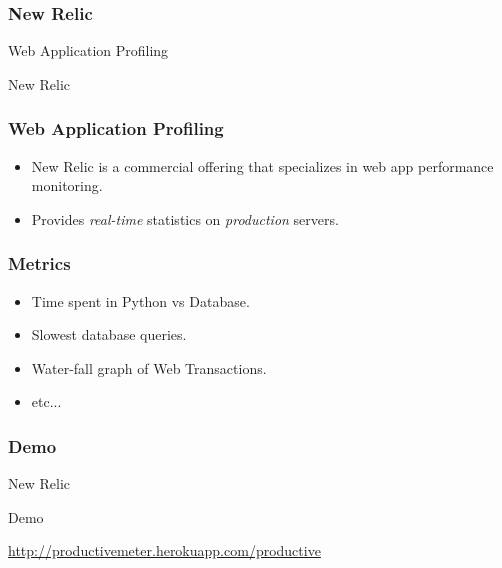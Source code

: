 \documentclass[c,english]{beamer}
\begin{document}
\begin{frame}[fragile]
\frametitle{New Relic}


\begin{block}{ \centering \LARGE Web Application Profiling }

\centering \Large New Relic

\end{block}
\end{frame}

\begin{frame}[fragile]
\frametitle{Web Application Profiling}

\begin{itemize}

\item New Relic is a commercial offering that specializes in web app performance monitoring.

\item Provides \emph{real-time} statistics on \emph{production} servers.
\end{itemize}
\end{frame}

\begin{frame}[fragile]
\frametitle{Metrics}

\begin{itemize}

\item Time spent in Python vs Database.

\item Slowest database queries.

\item Water-fall graph of Web Transactions.

\item etc...
\end{itemize}
\end{frame}

\begin{frame}[fragile]
\frametitle{Demo}


\begin{block}{ \centering \LARGE New Relic }

\centering \Large Demo

\end{block}

\url{http://productivemeter.herokuapp.com/productive}
\end{frame}
\end{document}

